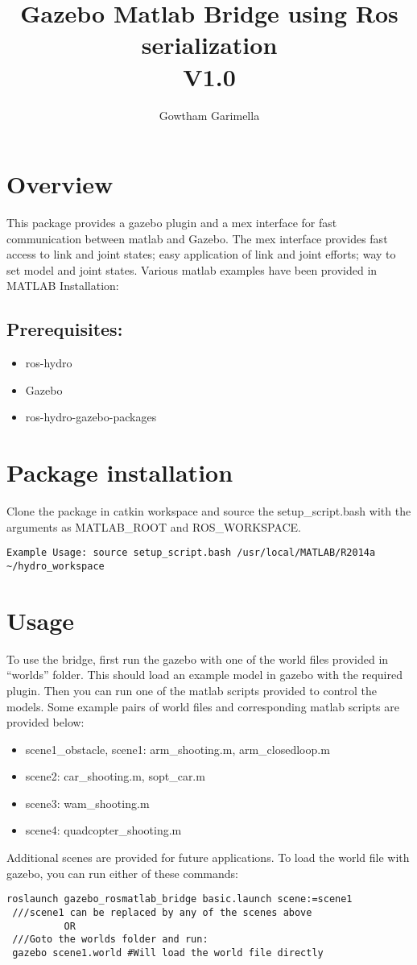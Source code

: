 \documentclass[letterpaper,10pt]{article}
\title{Gazebo Matlab Bridge using Ros serialization \\V1.0} \label{gazebo-matlab-bridge-using-ros-serialization}
\author{Gowtham Garimella}
\begin{document}
\maketitle

\section{Overview}
This package provides a gazebo plugin and a mex interface for fast
communication between matlab and Gazebo. The mex interface provides fast
access to link and joint states; easy application of link and joint
efforts; way to set model and joint states. Various matlab examples have
been provided in MATLAB Installation: 
\subsection{Prerequisites:}
\begin{itemize}
 \item  ros-hydro 
 \item Gazebo 
 \item ros-hydro-gazebo-packages
\end{itemize}

\section{Package installation}
Clone the package in catkin workspace and source the
setup\_script.bash with the arguments as MATLAB\_ROOT and
ROS\_WORKSPACE.
\begin{Verbatim}[frame=single]
Example Usage: source setup_script.bash /usr/local/MATLAB/R2014a ~/hydro_workspace
\end{Verbatim}
\section{Usage} 
To use the bridge, first run the gazebo with one of the world files provided in ``worlds''
folder. This should load an example model in gazebo with the required
plugin. Then you can run one of the matlab scripts provided to control
the models. Some example pairs of world files and corresponding matlab
scripts are provided below: 
\begin{itemize}
 \item scene1\_obstacle, scene1: arm\_shooting.m, arm\_closedloop.m 
 \item scene2: car\_shooting.m, sopt\_car.m 
 \item scene3: wam\_shooting.m 
 \item scene4: quadcopter\_shooting.m
\end{itemize}
Additional scenes are provided for future applications. To load the
world file with gazebo, you can run either of these commands: 
\begin{Verbatim}[frame=single]
 roslaunch gazebo_rosmatlab_bridge basic.launch scene:=scene1 
 ///scene1 can be replaced by any of the scenes above 
		  OR
 ///Goto the worlds folder and run:
 gazebo scene1.world #Will load the world file directly
\end{Verbatim}
\end{document}
